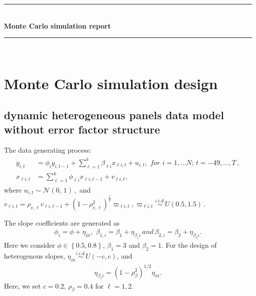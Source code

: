 \documentclass[12pt,a4paper,hyperref]{article}
\begin{document}
\begin{titlepage}

\newcommand{\HRule}{\rule{\linewidth}{0.5mm}} %

\center %



\HRule \\[0.4cm]
{ \huge \bfseries Monte Carlo simulation report }\\[0.4cm] %
\HRule \\[1.5cm]


\vfill %

\end{titlepage}

\newpage
\tableofcontents
\newpage
\section{Monte Carlo simulation design}
\subsection{dynamic heterogeneous panels data model without error factor structure}
The data generating process:
\begin{align}
\begin{split}
y_{i,t}&= \phi_{i} y_{i,t-1}+ \sum^{k}_{\ell=1}\beta_{\ell i}x_{\ell i,t}+u_{i,t}, \,\, for\,\,i=1,\ldots N;\,t=-49,\ldots,T\, , \\ \label{M1}
x_{\ell i,t}&=\sum^{k}_{\ell=1}\phi_{\ell i}x_{\ell i,t-1}+v_{\ell i,t},
\end{split}
\end{align}
where $u_{i,t}\sim \mathcal{N}(0,\,1)\,,$ and $v_{\ell i,t}=\rho_{v, \ell}v_{\ell i,t-1}+\left( 1-\rho^{2}_{v, \ell} \right)^{\frac{1}{2}}\varpi_{\ell i,t}, \varpi_{\ell i,t} \overset{i.i.d.}{\sim} U(0.5, 1.5) \,.$

The slope coefficients are generated as 
\begin{align}
\phi_{i}=\phi+\eta_{\phi i},\,\, \beta_{1,i}=\beta_{1}+\eta_{\beta_{1} i}\, and\, \beta_{2,i}=\beta_{2}+\eta_{\beta_{2}i}.
\end{align}
Here we consider $\phi \in \left\{0.5, 0.8 \right\}$, $\beta_{1}=3$ and $\beta_{2}=1$. For the design of heterogenous slopes, $\eta_{\phi i} \overset{i.i.d.}{\sim} U\left( -c, c\right)$, and 
\begin{align}
\eta_{\beta_{\ell}i}= \left(1-\rho^{2}_{\beta}  \right)^{1/2}\eta_{\phi i}. 
\end{align}
Here, we set $c=0.2,\, \rho_{\beta}=0.4$ for $\ell=1,2.$
\end{document}
